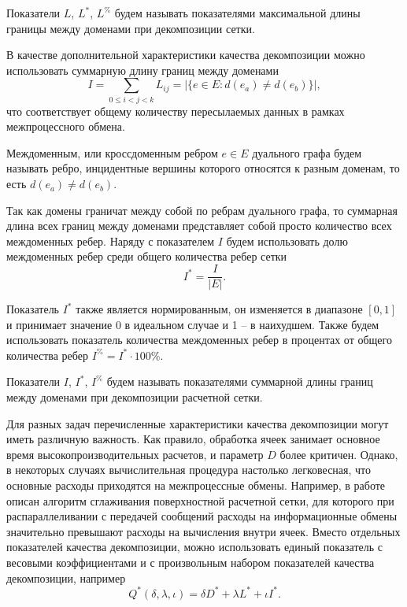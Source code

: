 \begin{definition}
Показатели $L$, $L^{*}$, $L^{\%}$ будем называть показателями максимальной длины границы между доменами при декомпозиции сетки.
\end{definition}

В качестве дополнительной характеристики качества декомпозиции можно использовать суммарную длину границ между доменами
\begin{equation}
	I = \sum_{0 \le i < j < k}{L_{ij}} = |\{ e \in E : d(e_a) \ne d(e_b) \}|,
\end{equation}
что соответствует общему количеству пересылаемых данных в рамках межпроцессного обмена.

\begin{definition}
Междоменным, или кроссдоменным ребром $e \in E$ дуального графа будем называть ребро, инцидентные вершины которого относятся к разным доменам, то есть $d(e_a) \ne d(e_b)$.
\end{definition}

Так как домены граничат между собой по ребрам дуального графа, то суммарная длина всех границ между доменами представляет собой просто количество всех междоменных ребер.
Наряду с показателем $I$ будем использовать долю междоменных ребер среди общего количества ребер сетки
\begin{equation}
	I^{*} = \frac{I}{|E|}.
\end{equation}

Показатель $I^{*}$ также является нормированным, он изменяется в диапазоне $[0, 1]$ и принимает значение 0 в идеальном случае и 1 -- в наихудшем.
Также будем использовать показатель количества междоменных ребер в процентах от общего количества ребер $I^{\%} = I^{*} \cdot 100\%$.

\begin{definition}
Показатели $I$, $I^{*}$, $I^{\%}$ будем называть показателями суммарной длины границ между доменами при декомпозиции расчетной сетки.
\end{definition}

Для разных задач перечисленные характеристики качества декомпозиции могут иметь различную важность.
Как правило, обработка ячеек занимает основное время высокопроизводительных расчетов, и параметр $D$ более критичен.
Однако, в некоторых случаях вычислительная процедура настолько легковесная, что основные расходы приходятся на межпроцессные обмены.
Например, в работе \cite{Tong2017Remesh} описан алгоритм сглаживания поверхностной расчетной сетки, для которого при распараллеливании с передачей сообщений расходы на информационные обмены значительно превышают расходы на вычисления внутри ячеек.
Вместо отдельных показателей качества декомпозиции, можно использовать единый показатель с весовыми коэффициентами и с произвольным набором показателей качества декомпозиции, например
\begin{equation}
	Q^{*}(\delta, \lambda, \iota) = \delta D^{*} + \lambda L^{*} + \iota I^{*}.
\end{equation}

